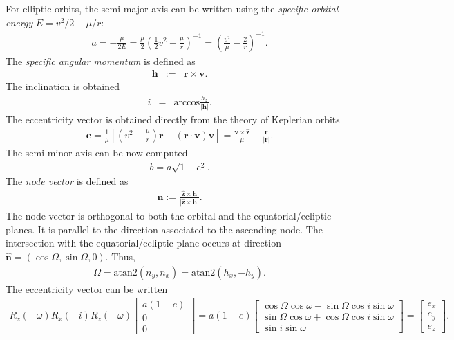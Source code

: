 \documentclass [12pt, a4paper] {article}
\newcommand{\vu}[1]
{
	\mathbf{\hat #1}
}
\newcommand{\vc}[1]
{
	\boldsymbol{#1}
}
\begin{document}
For elliptic orbits, the semi-major axis can be written using the 
\emph{specific orbital energy} $E=v^2/2 - \mu/r$:
\begin {eqnarray}
  a = -\frac{\mu}{2E} 
  = \frac{\mu}{2}\left(\frac{1}{2}v^2 - \frac{\mu}{r}\right)^{-1}
  = \left(\frac{v^2}{\mu} - \frac{2}{r}\right)^{-1}.
\end {eqnarray}
The \emph{specific angular momentum} is defined as
\begin {eqnarray}
  \vc h &:=& \vc r\times\vc v.
\end {eqnarray}
The inclination is obtained 
\begin {eqnarray}
  i &=& \textrm{arccos}\frac{h_z}{|\vc h|}.
\end {eqnarray}
The eccentricity vector is obtained directly from the theory of Keplerian 
orbits
\begin {eqnarray}
  \vc e = \frac{1}{\mu}\left[
    \left(v^2 - \frac{\mu}{r}\right)\vc r - (\vc r\cdot\vc v)\vc v
  \right]
  = 
  \frac{\vc v\times\vu z}{\mu} - \frac{\vc r}{|\vc r|}.
\end {eqnarray}
The semi-minor axis can be now computed
\begin {eqnarray}
  b = a\sqrt{1 - e^2}.
\end {eqnarray}
The \emph{node vector} is defined as 
\begin {eqnarray}
  \vc n := \frac{\vu z\times\vc h}{|\vu z\times\vc h|}.
\end {eqnarray}
The node vector is orthogonal to both the orbital and the 
equatorial/ecliptic planes. It is parallel to the direction associated
to the ascending node. The intersection with the equatorial/ecliptic plane 
occurs at direction $\vu n = (\cos\Omega, \sin\Omega, 0)$. Thus, 
\begin {eqnarray}
  \Omega = \textrm{atan2}\left(n_y, n_x\right) 
  = 
  \textrm{atan2}\left(h_x, -h_y\right).
\end {eqnarray}
The eccentricity vector can be written
\begin {eqnarray}
  R_z(-\omega)R_x(-i)R_z(-\omega)
  \begin {bmatrix}
  a(1-e) \\ 0 \\ 0
  \end {bmatrix}
  = 
  a(1-e)
  \begin {bmatrix}
  \cos\Omega\cos\omega - \sin\Omega\cos i\sin\omega \\
  \sin\Omega\cos\omega + \cos\Omega\cos i\sin\omega \\
  \sin i\sin\omega 
  \end {bmatrix}
  =
  \begin {bmatrix}
  e_x \\
  e_y \\
  e_z
  \end {bmatrix}.
\end {eqnarray}
\end{document}

